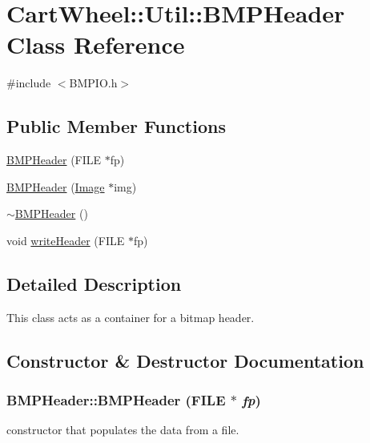 \hypertarget{classCartWheel_1_1Util_1_1BMPHeader}{
\section{CartWheel::Util::BMPHeader Class Reference}
\label{classCartWheel_1_1Util_1_1BMPHeader}
}


{\ttfamily \#include $<$BMPIO.h$>$}

\subsection*{Public Member Functions}
\begin{DoxyCompactItemize}
\item 
\hyperlink{classCartWheel_1_1Util_1_1BMPHeader_aa42121dff27a73ec2e4a6778b1cd4f1e}{BMPHeader} (FILE $\ast$fp)
\item 
\hyperlink{classCartWheel_1_1Util_1_1BMPHeader_a4632f2313cd1f0880ec9866792c83aad}{BMPHeader} (\hyperlink{classCartWheel_1_1Util_1_1Image}{Image} $\ast$img)
\item 
\hyperlink{classCartWheel_1_1Util_1_1BMPHeader_a74853e6cd6c446f6eb12c2793877695b}{$\sim$BMPHeader} ()
\item 
void \hyperlink{classCartWheel_1_1Util_1_1BMPHeader_a13ced4b3edf1a2701ee0eaeb46d0430a}{writeHeader} (FILE $\ast$fp)
\end{DoxyCompactItemize}


\subsection{Detailed Description}
This class acts as a container for a bitmap header. 

\subsection{Constructor \& Destructor Documentation}
\hypertarget{classCartWheel_1_1Util_1_1BMPHeader_aa42121dff27a73ec2e4a6778b1cd4f1e}{
\subsubsection[{BMPHeader}]{\setlength{\rightskip}{0pt plus 5cm}BMPHeader::BMPHeader (FILE $\ast$ {\em fp})}}
\label{classCartWheel_1_1Util_1_1BMPHeader_aa42121dff27a73ec2e4a6778b1cd4f1e}
constructor that populates the data from a file.

